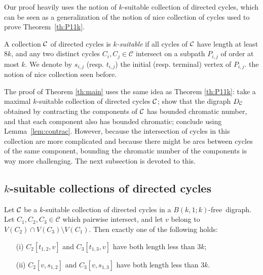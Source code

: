 \documentclass{endm}
\begin{document}
Our proof heavily uses the notion of $k$-suitable collection of directed cycles, which can be seen as a generalization of the notion of nice collection of cycles used to prove Theorem~\ref{th:P11k}.

 
 A collection ${\cal C}$ of directed cycles is {\it $k$-suitable} if all cycles of ${\cal C}$ have length at least $8k$, and
any two distinct cycles $C_i,C_j\in\mathcal C$ intersect on  a subpath $P_{i,j}$ of order at most $k$.
We denote by $s_{i,j}$ (resp. $t_{i,j}$) the initial (resp. terminal) vertex of  $P_{i,j}$. %
the notion of nice collection seen before. 

The proof of Theorem \ref{th:main} uses the same idea as Theorem \ref{th:P11k}: take a maximal $k$-suitable collection of directed cycles ${\cal C}$; show that the digraph $D_{\cal C}$ obtained by contracting the components of ${\cal C}$ has bounded chromatic number, and that each component also has bounded chromatic; conclude using Lemma~\ref{lem:contrac}. However, because the intersection of cycles in this collection are more
complicated and because there might be arcs between cycles of the same component, bounding the chromatic number of the components is way more challenging. The next subsection is devoted to this.
 
 
 \subsection{$k$-suitable collections of directed cycles}

 
 
 \begin{lemma}\label{lem:dis}
 Let ${\cal C}$ be a $k$-suitable collection of directed cycles in a $B(k,1;k)$-free\ digraph.
Let $C_1,C_2,C_3\in\mathcal C$ which pairwise intersect, and let $v$ belong to $V(C_2)\cap V(C_3)\setminus V(C_1)$. 
Then exactly one of the following holds:
\begin{itemize}
\item[(i)] $C_2[t_{1,2}, v]$ and $C_3[t_{1,3}, v]$ have both length less than $3k$; 
\item[(ii)] $C_2[v, s_{1,2}]$ and $C_3[v, s_{1,3}]$ have both length less than $3k$.
\end{itemize}
\end{lemma}
\end{document}
